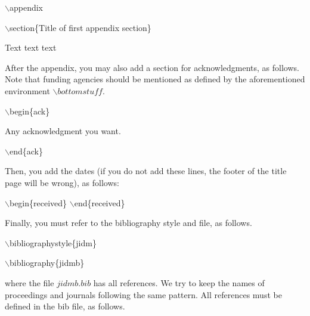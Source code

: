 \documentclass[jidm,a4paper]{jidm} %
\newenvironment{latexcode}
{\ttfamily\vspace{0.1in}\setlength{\parindent}{18pt}}
{\vspace{0.1in}}
\begin{document}
\begin{latexcode}
	$\backslash$appendix
	
	$\backslash$section\{Title of first appendix section\}

	Text text text
\end{latexcode}

After the appendix, you may also add a section for acknowledgments, as follows. Note that funding agencies should be mentioned as defined by the aforementioned environment $\backslash bottomstuff$.

\begin{latexcode}
				$\backslash$begin\{ack\}
				
				Any acknowledgment you want.
				
				$\backslash$end\{ack\}
\end{latexcode}

Then, you add the dates (if you do not add these lines, the footer of the title page will be wrong), as follows:

\begin{latexcode}
	$\backslash$begin\{received\}
	$\backslash$end\{received\}
\end{latexcode}

Finally, you must refer to the bibliography style and file, as follows.

	\begin{latexcode}
		$\backslash$bibliographystyle\{jidm\}

		$\backslash$bibliography\{jidmb\}
	\end{latexcode}

\noindent where the file $jidmb.bib$ has all references. We try to keep the names of proceedings and journals following the same pattern. All references must be defined in the bib file, as follows. 
\end{document}
